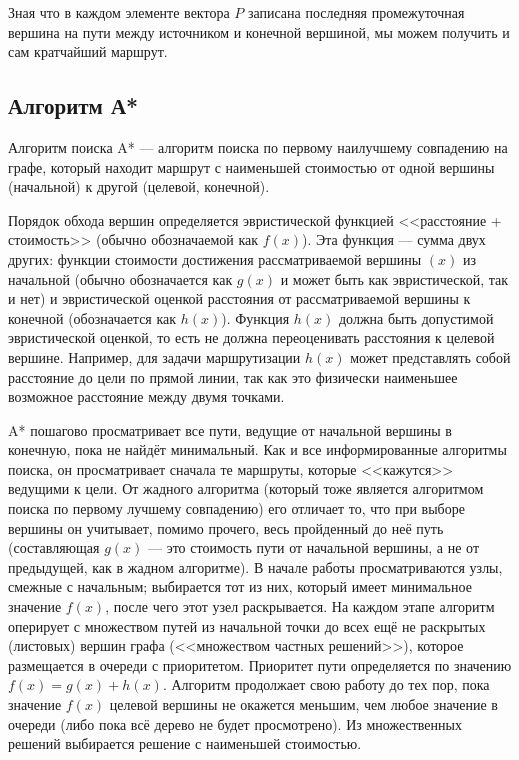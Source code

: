 Зная что в каждом элементе вектора $P$ записана последняя промежуточная вершина на пути между источником и конечной вершиной, мы можем получить и сам кратчайший маршрут.\cite{ad-habr}

\subsection{Алгоритм А*}
Алгоритм поиска A* --- алгоритм поиска по первому наилучшему совпадению на графе, который находит маршрут с наименьшей стоимостью от одной вершины (начальной) к другой (целевой, конечной).

Порядок обхода вершин определяется эвристической функцией <<расстояние + стоимость>> (обычно обозначаемой как $f(x)$). 
Эта функция --- сумма двух других: функции стоимости достижения рассматриваемой вершины $(x)$ из начальной (обычно обозначается как $g(x)$ и может быть как эвристической, так и нет) и эвристической оценкой расстояния от рассматриваемой вершины к конечной (обозначается как $h(x)$).
Функция $h(x)$ должна быть допустимой эвристической оценкой, то есть не должна переоценивать расстояния к целевой вершине.
Например, для задачи маршрутизации $h(x)$ может представлять собой расстояние до цели по прямой линии, так как это физически наименьшее возможное расстояние между двумя точками.

A* пошагово просматривает все пути, ведущие от начальной вершины в конечную, пока не найдёт минимальный. 
Как и все информированные алгоритмы поиска, он просматривает сначала те маршруты, которые <<кажутся>> ведущими к цели. 
От жадного алгоритма (который тоже является алгоритмом поиска по первому лучшему совпадению) его отличает то, что при выборе вершины он учитывает, помимо прочего, весь пройденный до неё путь (составляющая $g(x)$ --- это стоимость пути от начальной вершины, а не от предыдущей, как в жадном алгоритме). 
В начале работы просматриваются узлы, смежные с начальным; выбирается тот из них, который имеет минимальное значение $f(x)$, после чего этот узел раскрывается. 
На каждом этапе алгоритм оперирует с множеством путей из начальной точки до всех ещё не раскрытых (листовых) вершин графа (<<множеством частных решений>>), которое размещается в очереди с приоритетом. 
Приоритет пути определяется по значению $f(x) = g(x) + h(x)$. 
Алгоритм продолжает свою работу до тех пор, пока значение $f(x)$ целевой вершины не окажется меньшим, чем любое значение в очереди (либо пока всё дерево не будет просмотрено). 
Из множественных решений выбирается решение с наименьшей стоимостью.

